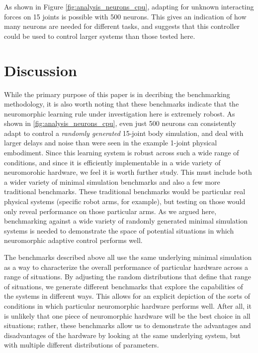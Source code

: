 \documentclass{frontiersSCNS} %
\begin{document}
As shown in Figure \ref{fig:analysis_neurons_cpu}, adapting for unknown
interacting forces on 15 joints is possible with 500 neurons.  This gives
an indication of how many neurons are needed for different tasks, and suggests
that this controller could be used to control larger systems than those tested here.

\section{Discussion}

While the primary purpose of this paper is in decribing the benchmarking
methodology, it is also worth noting that these benchmarks indicate
that the neuromorphic learning rule under investigation here is extremely robost.  As
shown in \ref{fig:analysis_neurons_cpu}, even just 500 neurons can consistently
adapt to control a \emph{randomly generated} 15-joint body simulation, and
deal with larger delays and noise than were seen in the example 1-joint
physical embodiment.  Since this learning system is robust across such a
wide range of conditions, and since it is efficiently implementable in a
wide variety of neuromorohic hardware, we feel it is worth further study.  This must include 
both a wider variety of minimal simulation benchmarks and also a few more 
traditional benchmarks.  These traditional
benchmarks would be particular real physical systems (specific robot arms,
for example), but testing on those would only reveal performance on those
particular arms.  As we argued here, benchmarking against a wide variety of 
randomly generated minimal simulation systems is needed to demonstrate the
space of potential situations in which neuromorphic adaptive control performs well.

The benchmarks described above all use the same underlying minimal simulation
as a way to characterize the overall performance of particular hardware
across a range of situations.  By adjusting the random distributions that
define that range of situations, we generate different benchmarks that
explore the capabilities of the systems in different ways.  This allows for
an explicit depiction of the sorts of conditions in which particular
neuromorphic hardware performs well.  After all, it is unlikely that one
piece of neuromorphic hardware will be the best choice in all situations;
rather, these benchmarks allow us to demonstrate the advantages and disadvantages
of the hardware by looking at the same underlying system, but with multiple
different distributions of parameters.
\end{document}
